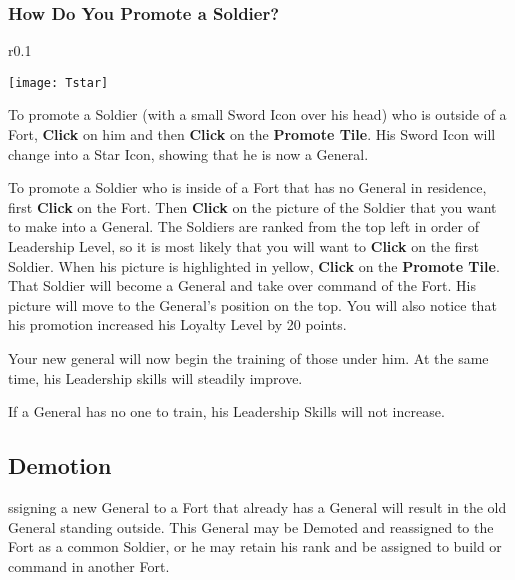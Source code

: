 \subsubsection{\textsf{How Do You Promote a Soldier?}}

\begin{wrapfigure}{r}{0.1\textwidth}
    \vspace{-20pt}
    \begin{center}
        \texttt{[image: Tstar]}
    \end{center}
    \vspace{-20pt}
\end{wrapfigure}


To promote a Soldier (with a small Sword Icon over his head) who is outside of a Fort, \textbf{Click} on him and then \textbf{Click} on the \textbf{Promote Tile}. His Sword Icon will change into a Star Icon, showing that he is now a General.

To promote a Soldier who is inside of a Fort that has no General in residence, first \textbf{Click} on the Fort. Then \textbf{Click} on the picture of the Soldier that you want to make into a General. The Soldiers are ranked from the top left in order of Leadership Level, so it is most likely that you will want to \textbf{Click} on the first Soldier. When his picture is highlighted in yellow, \textbf{Click} on the \textbf{Promote Tile}. That Soldier will become a General and take over command of the Fort. His picture will move to the General’s position on the top. You will also notice that his promotion increased his Loyalty Level by 20 points.

Your new general will now begin the training of those under him. At the same time, his Leadership skills will steadily improve.

If a General has no one to train, his Leadership Skills will not increase.

\subsection{\textsf{Demotion}}


ssigning a new General to a Fort that already has a General will result in the old General standing outside. This General may be Demoted and reassigned to the Fort as a common Soldier, or he may retain his rank and be assigned to build or command in another Fort.

